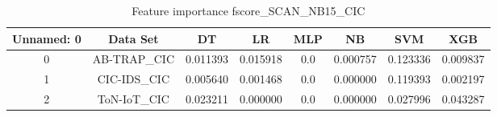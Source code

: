 \begin{table}[H]
\centering
\caption{Feature importance fscore_SCAN_NB15_CIC}
\label{fscore_SCAN_NB15_CIC}
\begin{tabular}{cccccccc}
\toprule
 Unnamed: 0 &    Data Set &       DT &       LR &  MLP &       NB &      SVM &      XGB \\
\midrule
          0 & AB-TRAP\_CIC & 0.011393 & 0.015918 &  0.0 & 0.000757 & 0.123336 & 0.009837 \\
          1 & CIC-IDS\_CIC & 0.005640 & 0.001468 &  0.0 & 0.000000 & 0.119393 & 0.002197 \\
          2 & ToN-IoT\_CIC & 0.023211 & 0.000000 &  0.0 & 0.000000 & 0.027996 & 0.043287 \\
\bottomrule
\end{tabular}
\end{table}

